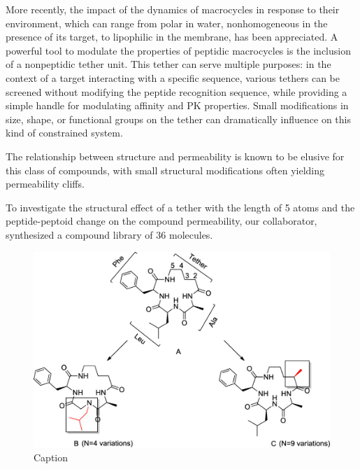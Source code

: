 More recently, the impact of the dynamics of macrocycles in response to their environment, which can range from polar in water, nonhomogeneous in the presence of its target, to lipophilic in the membrane, has been appreciated.\cite{Danelius2020, Witek2017, Riniker2019, Witek2019}
A powerful tool to modulate the properties of peptidic macrocycles is the inclusion of a nonpeptidic tether unit.\cite{Marsault2007, Hoveyda2011, Roux2020} 
This tether can serve multiple purposes: in the context of a target interacting with a specific sequence, various tethers can be screened without modifying the peptide recognition sequence, while providing a simple handle for modulating affinity and PK properties. 
Small modifications in size, shape, or functional groups on the tether can dramatically influence on this kind of constrained system.\cite{Appavoo2019}

The relationship between structure and permeability is known to be elusive for this class of compounds, with small structural modifications often yielding permeability cliffs. \cite{Wang2014, Räder2018, Beck2012, White2011, Roux2020, Bockus2015, Hewitt2015, Rezai2006, Over2016}

To investigate the structural effect of a tether with the length of  5 atoms and the peptide-peptoid change on the compound permeability, our collaborator, synthesized a compound library of 36 molecules. \cite{Comeau2021, Roux2020}

\begin{figure}
    \centering
    \includegraphics[width=\textwidth]{7_chapter_5/fig/intro/MoleculeDesign.jpeg}
    \caption{Caption}
    \label{fig:MolDes}
\end{figure}

